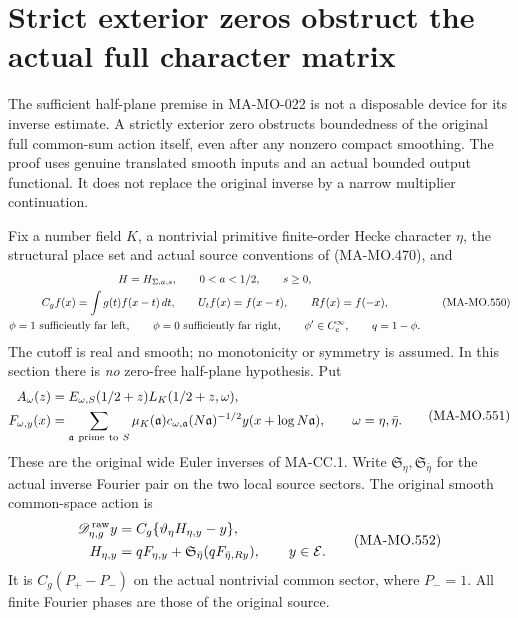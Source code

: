 \section{Strict exterior zeros obstruct the actual full character matrix}
\label{sec:character-exterior-obstruction}

The sufficient half-plane premise in MA-MO-022 is not a
disposable device for its inverse estimate. A strictly exterior
zero obstructs boundedness of the original full common-sum
action itself, even after any nonzero compact smoothing.
The proof uses genuine translated smooth inputs and an actual
bounded output functional. It does not replace the original
inverse by a narrow multiplier continuation.

Fix a number field \(K\), a nontrivial primitive finite-order
Hecke character \(\eta\), the structural place set and actual
source conventions of (MA-MO.470), and
\[
 \begin{gathered}
 H=H_{\Sigma,a,s},\qquad 0<a<1/2,\qquad s\ge0,\\
 C_gf(x)=\int g(t)f(x-t)\,dt,\qquad
 U_tf(x)=f(x-t),\qquad Rf(x)=f(-x),\\
 \phi=1\ \hbox{sufficiently far left},\qquad
 \phi=0\ \hbox{sufficiently far right},\qquad
 \phi'\in C_c^\infty,\qquad q=1-\phi .
 \end{gathered}
 \tag{MA-MO.550}
\]
The cutoff is real and smooth; no monotonicity or symmetry
is assumed. In this section there is \emph{no} zero-free
half-plane hypothesis. Put
\[
 \begin{aligned}
 A_\omega(z)&=E_{\omega,S}(1/2+z)L_K(1/2+z,\omega),\\
 F_{\omega,y}(x)&=
   \sum_{\mathfrak a\ {\rm prime\ to}\ S}
     \mu_K(\mathfrak a)c_{\omega,\mathfrak a}
       (N\mathfrak a)^{-1/2}y(x+\log N\mathfrak a),
       \qquad \omega=\eta,\bar\eta .
 \end{aligned}
 \tag{MA-MO.551}
\]
These are the original wide Euler inverses of MA-CC.1.
Write \(\mathfrak S_\eta,\mathfrak S_{\bar\eta}\) for the
actual inverse Fourier pair on the two local source sectors.
The original smooth common-space action is
\[
 \begin{aligned}
 \mathscr D^{\,\rm raw}_{\eta,g}y
   &=C_g\{\vartheta_\eta H_{\eta,y}-y\},\\
 H_{\eta,y}
   &=qF_{\eta,y}
       +\mathfrak S_{\bar\eta}(qF_{\bar\eta,Ry}),
                         \qquad y\in\mathcal E .
 \end{aligned}
 \tag{MA-MO.552}
\]
It is \(C_g(P_+-P_-)\) on the actual nontrivial common
sector, where \(P_-=1\). All finite Fourier phases are
those of the original source.

